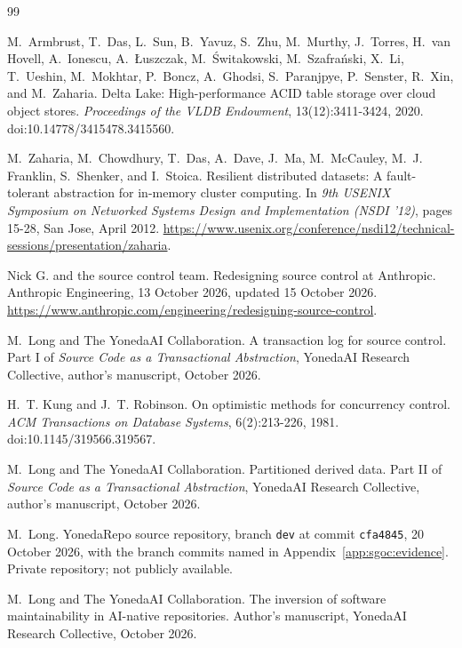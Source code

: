 \documentclass[11pt,letterpaper]{article}
\theoremstyle{definition}
\theoremstyle{remark}
\begin{document}
\begin{thebibliography}{99}
\small

M.~Armbrust, T.~Das, L.~Sun, B.~Yavuz, S.~Zhu, M.~Murthy, J.~Torres, H.~van Hovell, A.~Ionescu, A.~{\L}uszczak, M.~{\'S}witakowski, M.~Szafra{\'n}ski, X.~Li, T.~Ueshin, M.~Mokhtar, P.~Boncz, A.~Ghodsi, S.~Paranjpye, P.~Senster, R.~Xin, and M.~Zaharia.
\newblock Delta {Lake}: High-performance {ACID} table storage over cloud object stores.
\newblock \emph{Proceedings of the VLDB Endowment}, 13(12):3411-3424, 2020.
\newblock doi:10.14778/3415478.3415560.

M.~Zaharia, M.~Chowdhury, T.~Das, A.~Dave, J.~Ma, M.~McCauley, M.~J. Franklin, S.~Shenker, and I.~Stoica.
\newblock Resilient distributed datasets: A fault-tolerant abstraction for in-memory cluster computing.
\newblock In \emph{9th USENIX Symposium on Networked Systems Design and Implementation (NSDI '12)}, pages 15-28, San Jose, April 2012.
\newblock \url{https://www.usenix.org/conference/nsdi12/technical-sessions/presentation/zaharia}.

Nick G. and the source control team.
\newblock Redesigning source control at {Anthropic}.
\newblock Anthropic Engineering, 13 October 2026, updated 15 October 2026.
\newblock \url{https://www.anthropic.com/engineering/redesigning-source-control}.

M.~Long and The YonedaAI Collaboration.
\newblock A transaction log for source control.
\newblock Part I of \emph{Source Code as a Transactional Abstraction}, YonedaAI Research Collective, author's manuscript, October 2026.

H.~T. Kung and J.~T. Robinson.
\newblock On optimistic methods for concurrency control.
\newblock \emph{ACM Transactions on Database Systems}, 6(2):213-226, 1981.
\newblock doi:10.1145/319566.319567.

M.~Long and The YonedaAI Collaboration.
\newblock Partitioned derived data.
\newblock Part II of \emph{Source Code as a Transactional Abstraction}, YonedaAI Research Collective, author's manuscript, October 2026.

M.~Long.
\newblock YonedaRepo source repository, branch \texttt{dev} at commit \texttt{cfa4845}, 20 October 2026, with the branch commits named in Appendix~\ref{app:sgoc:evidence}. Private repository; not publicly available.

M.~Long and The YonedaAI Collaboration.
\newblock The inversion of software maintainability in {AI}-native repositories.
\newblock Author's manuscript, YonedaAI Research Collective, October 2026.


\end{thebibliography}
\end{document}
